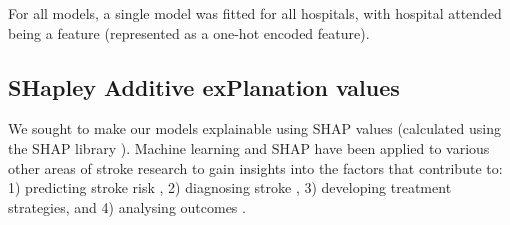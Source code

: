 For all models, a single model was fitted for all hospitals, with hospital attended being a feature (represented as a one-hot encoded feature).

\iffalse
\subsection{Characteristics of the most thrombolysable patient (at each hospital)}
We identified the patient at each hospital that the model predicted had the highest probability of receiving thrombolysis (using the combined test-set results from the \emph{k-fold model}), and compared the feature values of those 132 patients to:
\begin{itemize}
\item All patients
\item All patients who had received thrombolysis
\item All patients who had not received thrombolysis
\end{itemize}
\fi

\subsection{SHapley Additive exPlanation values}

We sought to make our models explainable using SHAP values (calculated using the SHAP library \cite{lundberg_unified_2017}). Machine learning and SHAP have been applied to various other areas of stroke research to gain insights into the factors that contribute to: 1) predicting stroke risk \cite{Christos Kokkotis} \cite{Junjie Liu}  \cite{A. Papadopoulou}, 2) diagnosing stroke \cite{Yulu Zheng}, 3) developing treatment strategies, and 4) analysing outcomes \cite{Po-Yuan Su 2022} \cite{Xiaohan Zheng} \cite{Seong-Hwan Kim}.



